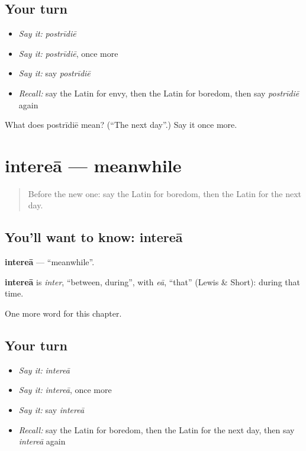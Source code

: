 \subsection*{Your turn}
\begin{itemize}
\raggedright
  \item \emph{Say it:} \emph{postrīdiē}
  \item \emph{Say it:} \emph{postrīdiē}, once more
  \item \emph{Say it:} say \emph{postrīdiē}
  \item \emph{Recall:} say the Latin for envy, then the Latin for boredom, then say \emph{postrīdiē} again
\end{itemize}

\begin{tcolorbox}[breakable,colback=teal!4,colframe=teal!35!black,title={Before you move on}]
What does postrīdiē mean? (\textquotedblleft{}The next day\textquotedblright{}.) Say it once more.
\end{tcolorbox}
\section[intereā]{intereā — meanwhile}

\label{lesson:LA-C263-interea}



\begin{quote}
Before the new one: say the Latin for boredom, then the Latin for the next day.
\end{quote}

\subsection*{You'll want to know: intereā}
\textbf{intereā} — \textquotedblleft{}meanwhile\textquotedblright{}.

\begin{cousinweb}
\textbf{intereā} is \emph{inter}, \textquotedblleft{}between, during\textquotedblright{}, with \emph{eā}, \textquotedblleft{}that\textquotedblright{} (Lewis \& Short): during that time.
\end{cousinweb}

\begin{grammarlens}[title={What you've built}]
One more word for this chapter.
\end{grammarlens}

\subsection*{Your turn}
\begin{itemize}
\raggedright
  \item \emph{Say it:} \emph{intereā}
  \item \emph{Say it:} \emph{intereā}, once more
  \item \emph{Say it:} say \emph{intereā}
  \item \emph{Recall:} say the Latin for boredom, then the Latin for the next day, then say \emph{intereā} again
\end{itemize}

